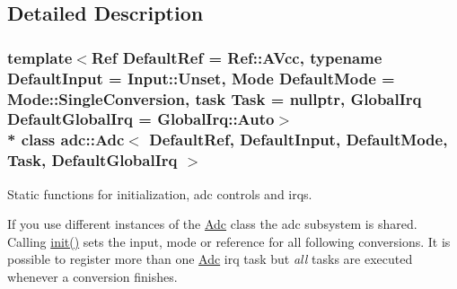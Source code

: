 \subsection{Detailed Description}
\subsubsection*{template$<$Ref Default\+Ref = Ref\+::\+A\+Vcc, typename Default\+Input = Input\+::\+Unset, Mode Default\+Mode = Mode\+::\+Single\+Conversion, task Task = nullptr, Global\+Irq Default\+Global\+Irq = Global\+Irq\+::\+Auto$>$\\*
class adc\+::\+Adc$<$ Default\+Ref, Default\+Input, Default\+Mode, Task, Default\+Global\+Irq $>$}

Static functions for initialization, adc controls and irqs. 

If you use different instances of the \hyperlink{classadc_1_1Adc}{Adc} class the adc subsystem is shared. Calling \hyperlink{classadc_1_1Adc_a146fe898e16915e9b344019c59cdcfa3}{init()} sets the input, mode or reference for all following conversions. It is possible to register more than one \hyperlink{classadc_1_1Adc}{Adc} irq task but {\itshape all} tasks are executed whenever a conversion finishes.


